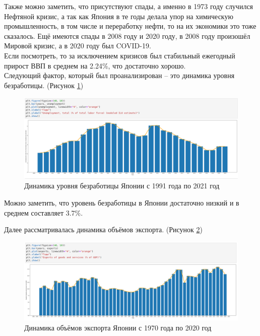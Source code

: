 \documentclass[14pt,fleqn]{extarticle}
\begin{document}
	Также можно заметить, что присутствуют спады, а именно в 1973 году случился Нефтяной кризис, а так как Япония в те годы делала упор на химическую промышленность, в том числе и переработку нефти, то на их экономики это тоже сказалось. Ещё имеются спады в 2008 году и 2020 году, в 2008 году произошёл Мировой кризис, а в 2020 году был COVID-19.\\
	
	Если посмотреть, то за исключением кризисов был стабильный ежегодный прирост ВВП в среднем на 2.24\%, что достаточно хорошо.\\
	
	Следующий фактор, который был проанализирован -- это динамика уровня безработицы. (Рисунок \ref{fig:japan_unemployment_plot})
	
	\begin{figure}[h]
		\centering \includegraphics[scale=0.42]{japan_unemployment_plot}
		\caption{Динамика уровня безработицы Японии с 1991 года по 2021 год}
		\label{fig:japan_unemployment_plot}
	\end{figure}

	Можно заметить, что уровень безработицы в Японии достаточно низкий и в среднем составляет 3.7\%.
	
	\newpage
	
	Далее рассматривалась динамика объёмов экспорта. (Рисунок \ref{fig:japan_export_plot})
	
	\begin{figure}[h]
		\centering \includegraphics[scale=0.42]{japan_export_plot}
		\caption{Динамика объёмов экспорта Японии с 1970 года по 2020 год}
		\label{fig:japan_export_plot}
	\end{figure}
\end{document}
